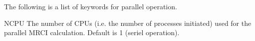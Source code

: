 The following is a list of keywords for parallel operation.
\begin{keywordlist}
\item[NCPU]
The number of CPUs (i.e. the number of processes initiated) used for the
parallel MRCI calculation. Default is 1 (seriel operation).

\end{keywordlist}
